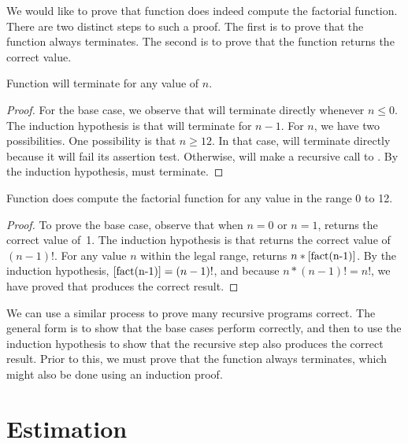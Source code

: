 \begin{example}
We would like to prove that function  does indeed compute
the factorial function.
There are two distinct steps to such a proof.
The first is to prove that the function always terminates.
The second is to prove that the function returns the correct value.
\medskip

\begin{theorem}
Function  will terminate for any value of \(n\).
\end{theorem}

\begin{proof}
For the base case, we observe that  will terminate directly 
whenever \(n \leq 0\).
The induction hypothesis is that  will terminate for \(n-1\).
For \(n\), we have two possibilities.
One possibility is that \(n \geq 12\).
In that case,  will terminate directly because it will
fail its assertion test.
Otherwise,  will make a recursive call to .
By the induction hypothesis,  must terminate.
\end{proof}
\medskip

\begin{theorem}
Function  does compute the factorial function for any value 
in the range 0 to 12.
\end{theorem}

\begin{proof}
To prove the base case, observe that when \(n=0\) or \(n=1\),
 returns the correct value of~1.
The induction hypothesis is that  returns the correct
value of \((n-1)!\).
For any value \(n\) within the legal range,  returns
\(n*\mbox{\Cref{fact(n-1)}}\).
By the induction hypothesis, \(\mbox{\Cref{fact(n-1)}} = (n-1)!\),
and because \(n * (n-1)! = n!\), we have proved that 
produces the correct result.
\end{proof}
\end{example}

We can use a similar process to prove many recursive programs correct.
The general form is to show that the base cases perform correctly, and 
then to use the induction hypothesis to show that the recursive step
also produces the correct result.
Prior to this, we must prove that the function always terminates,
which might also be done using an induction proof.

\section{Estimation}
\label{Estimate}

